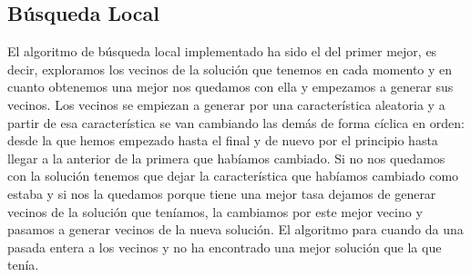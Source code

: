 \documentclass[12pt]{article}
\begin{document}
\subsection{Búsqueda Local}
El algoritmo de búsqueda local implementado ha sido el del primer mejor, es decir, exploramos los vecinos de la solución que tenemos en cada momento y en cuanto obtenemos una mejor nos quedamos con ella y empezamos a generar sus vecinos. Los vecinos se empiezan a generar por una característica aleatoria y a partir de esa característica se van cambiando las demás de forma cíclica en orden: desde la que hemos empezado hasta el final y de nuevo por el principio hasta llegar a la anterior de la primera que habíamos cambiado. Si no nos quedamos con la solución tenemos que dejar la característica que habíamos cambiado como estaba y si nos la quedamos porque tiene una mejor tasa dejamos de generar vecinos de la solución que teníamos, la cambiamos por este mejor vecino y pasamos a generar vecinos de la nueva solución. El algoritmo para cuando da una pasada entera a los vecinos y no ha encontrado una mejor solución que la que tenía.\\
\end{document}
